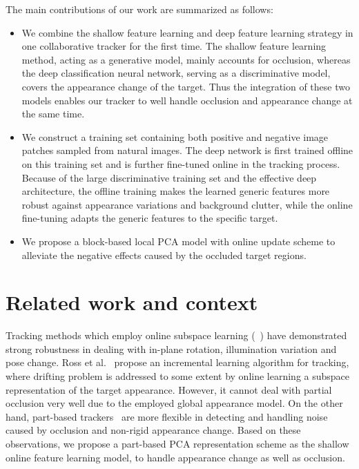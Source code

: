 \documentclass[preprint,12pt,review]{elsarticle}
\begin{document}
The main contributions of our work are summarized as follows:
\begin{itemize}

\item { We combine the shallow feature learning and deep feature learning strategy in one collaborative tracker for the first time.
The shallow feature learning method, acting as a generative model, mainly accounts for occlusion, whereas the deep classification neural network, serving as a discriminative model, covers the appearance change of the target.
Thus the integration of these two models enables our tracker to well handle occlusion and appearance change at the same time.
}

\item{We construct a training set containing both positive and negative image patches sampled from natural images.
    The deep network is first trained offline on this training set and is further fine-tuned online in the tracking process.
    Because of the large discriminative training set and the effective deep architecture, the offline training makes the learned generic features more robust against appearance variations and background clutter, while the online fine-tuning adapts the generic features to the specific target.
} 
\item{We propose a block-based local PCA model with online update scheme to alleviate the negative effects caused by the occluded target regions.} 
\end{itemize}


\section{Related work and context}
Tracking methods which employ online subspace learning (~\cite{ ross2008incremental, wang2010incremental, wang2007object, hu2011incremental}) have demonstrated strong robustness in dealing with in-plane rotation, illumination variation and pose change.
Ross et al.~\cite{ross2008incremental} propose an incremental learning algorithm for tracking, where drifting problem is addressed to some extent by online learning a subspace representation of the target appearance.
However, it cannot deal with partial occlusion very well due to the employed global appearance model.
On the other hand, part-based trackers~\cite{adam2006Frag, liu2011robust} are more flexible in detecting and handling noise caused by occlusion and non-rigid appearance change.
Based on these observations, we propose a part-based PCA representation scheme as the shallow online feature learning model, to handle appearance change as well as occlusion.
\end{document}
